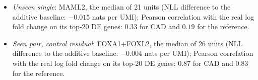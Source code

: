 \begin{itemize}
\item[(a)] \emph{Unseen single}: MAML2, the median of 21 units (NLL difference to the additive baseline: $-0.015$ nats per UMI); Pearson correlation with the real log fold change on its top-20 DE genes: $0.33$ for CAD and $0.19$ for the reference.
\item[(b)] \emph{Seen pair, control residual}: FOXA1+FOXL2, the median of 26 units (NLL difference to the additive baseline: $-0.004$ nats per UMI); Pearson correlation with the real log fold change on its top-20 DE genes: $0.87$ for CAD and $0.83$ for the reference.
\end{itemize}
